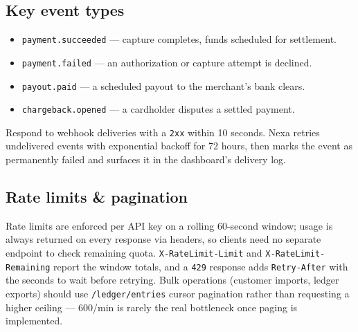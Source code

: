 \documentclass[10pt]{article}
\begin{document}
\subsection{Key event types}
\begin{minipage}[t]{0.5\textwidth}
\begin{itemize}[itemsep=1.5pt, topsep=1.5pt, leftmargin=1.4em]
  \item \texttt{payment.succeeded} --- capture completes, funds scheduled for settlement.
  \item \texttt{payment.failed} --- an authorization or capture attempt is declined.
\end{itemize}
\end{minipage}%
\begin{minipage}[t]{0.5\textwidth}
\begin{itemize}[itemsep=1.5pt, topsep=1.5pt, leftmargin=1.4em]
  \item \texttt{payout.paid} --- a scheduled payout to the merchant's bank clears.
  \item \texttt{chargeback.opened} --- a cardholder disputes a settled payment.
\end{itemize}
\end{minipage}
\par

\begin{warnbox}
Respond to webhook deliveries with a \texttt{2xx} within 10 seconds. Nexa retries
undelivered events with exponential backoff for 72 hours, then marks the event as
permanently failed and surfaces it in the dashboard's delivery log.
\end{warnbox}

\subsection{Rate limits \& pagination}

Rate limits are enforced per API key on a rolling 60-second window; usage is always
returned on every response via headers, so clients need no separate endpoint to check
remaining quota. \texttt{X-RateLimit-Limit} and \texttt{X-RateLimit-Remaining} report the
window totals, and a \texttt{429} response adds \texttt{Retry-After} with the seconds to
wait before retrying. Bulk operations (customer imports, ledger exports) should use
\texttt{/ledger/entries} cursor pagination rather than requesting a higher ceiling ---
600/min is rarely the real bottleneck once paging is implemented.

\end{document}
